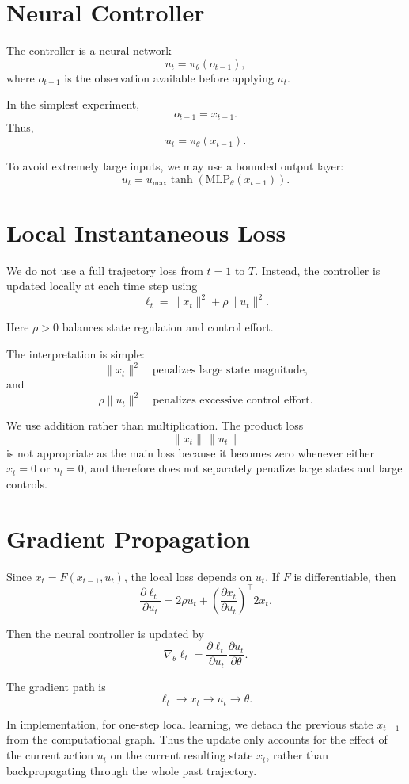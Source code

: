 \documentclass[11pt]{ctexart}
\begin{document}
\section{Neural Controller}

The controller is a neural network
\[
u_t = \pi_\theta(o_{t-1}),
\]
where \(o_{t-1}\) is the observation available before applying \(u_t\).

In the simplest experiment,
\[
o_{t-1}=x_{t-1}.
\]
Thus,
\[
u_t = \pi_\theta(x_{t-1}).
\]

To avoid extremely large inputs, we may use a bounded output layer:
\[
u_t = u_{\max}\tanh(\mathrm{MLP}_\theta(x_{t-1})).
\]

\section{Local Instantaneous Loss}

We do not use a full trajectory loss from \(t=1\) to \(T\). Instead, the controller is updated locally at each time step using
\[
\ell_t
=
\|x_t\|^2+\rho\|u_t\|^2.
\]

Here \(\rho>0\) balances state regulation and control effort.

The interpretation is simple:
\[
\|x_t\|^2
\quad \text{penalizes large state magnitude,}
\]
and
\[
\rho\|u_t\|^2
\quad \text{penalizes excessive control effort.}
\]

We use addition rather than multiplication. The product loss
\[
\|x_t\|\,\|u_t\|
\]
is not appropriate as the main loss because it becomes zero whenever either \(x_t=0\) or \(u_t=0\), and therefore does not separately penalize large states and large controls.

\section{Gradient Propagation}

Since \(x_t=F(x_{t-1},u_t)\), the local loss depends on \(u_t\). If \(F\) is differentiable, then
\[
\frac{\partial \ell_t}{\partial u_t}
=
2\rho u_t
+
\left(\frac{\partial x_t}{\partial u_t}\right)^\top 2x_t.
\]

Then the neural controller is updated by
\[
\nabla_\theta \ell_t
=
\frac{\partial \ell_t}{\partial u_t}
\frac{\partial u_t}{\partial \theta}.
\]

The gradient path is
\[
\ell_t
\longrightarrow
x_t
\longrightarrow
u_t
\longrightarrow
\theta.
\]

In implementation, for one-step local learning, we detach the previous state \(x_{t-1}\) from the computational graph. Thus the update only accounts for the effect of the current action \(u_t\) on the current resulting state \(x_t\), rather than backpropagating through the whole past trajectory.
\end{document}
